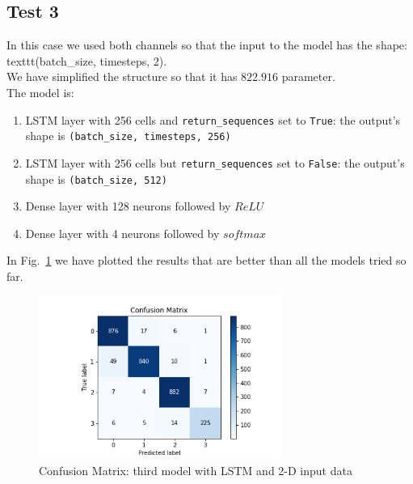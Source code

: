 \documentclass[LaM,binding=0.6cm]{sapthesis}
\begin{document}
\subsection{Test 3}
In this case we used both channels so that the input to the model has the shape: texttt{(batch\_size, timesteps, 2)}.\\We have simplified the structure so that it has $822.916$ parameter.\\The model is:
\begin{enumerate}
\item LSTM layer with 256 cells and \texttt{return\_sequences} set to \texttt{True}: the output's shape is \texttt{(batch\_size, timesteps, 256)} 
\item LSTM layer with 256 cells but \texttt{return\_sequences} set to \texttt{False}: the output's shape is \texttt{(batch\_size, 512)} 
\item Dense layer with 128 neurons followed by $ReLU$
\item Dense layer with 4 neurons followed by $softmax$
\end{enumerate}
In Fig.~\ref{fig:lstmt3} we have plotted the results that are better than all the models tried so far.
\begin{figure}[H]  \centering
	\includegraphics[width=80mm,scale=0.7]{lstmt3}
	\caption{Confusion Matrix: third model with LSTM and 2-D input data}
	\label{fig:lstmt3}
\end{figure}
\end{document}
